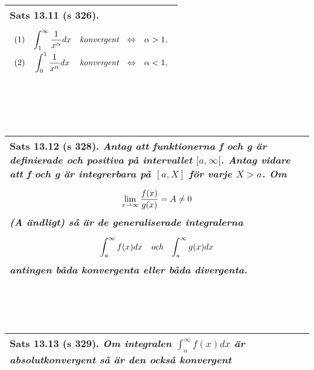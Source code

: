 \documentclass[a4paper]{article}
\begin{document}
\\\\\\
\begin{tabular}{|L{11.5cm}|} \hline
\textbf{Sats 13.11} (s 326).
\begin{equation*}
\renewcommand{\arraystretch}{2.2}
\begin{array}{l>{\displaystyle}clcr}
(1) & \int_{1}^{\infty}\frac{1}{x^\alpha}dx & \textit{konvergent} & \Leftrightarrow & \alpha>1, \\
(2) & \int_{0}^{1}\frac{1}{x^\alpha}dx & \textit{konvergent} & \Leftrightarrow & \alpha<1, \\
\end{array}
\end{equation*}
\\\hline
\end{tabular}
\\\\\\
\begin{tabular}{|L{11.5cm}|} \hline
\textbf{Sats 13.12} (s 328).
\textit{Antag att funktionerna f och g är definierade och positiva på intervallet $[a,\infty[$. Antag vidare att f och g är integrerbara på $[a,X]$ för varje $X>a$. Om}
\begin{equation*}
\begin{array}{>{\displaystyle}c}
\lim\limits_{x\to \infty}\frac{f(x)}{g(x)}=A\neq 0
\end{array}
\end{equation*}
\textit{(A ändligt) så är de generaliserade integralerna}
\begin{equation*}
\begin{array}{>{\displaystyle}cc>{\displaystyle}c}
\int_{a}^{\infty}f(x)dx & \textit{och} & \int_{a}^{\infty}g(x)dx
\end{array}
\end{equation*}
\textit{antingen båda konvergenta eller båda divergenta.}
\\\hline
\end{tabular}
\\\\\\
\begin{tabular}{|L{11.5cm}|} \hline
\textbf{Sats 13.13} (s 329).
\textit{Om integralen $\int_{a}^{\infty}f(x)dx$ är absolutkonvergent så är den också konvergent}
\\\hline
\end{tabular}
\\\\\\
\end{document}
